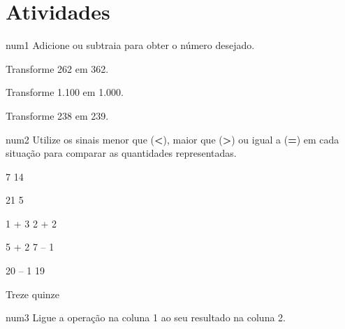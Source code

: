 \pagebreak 

\section*{Atividades}

num{1} Adicione ou subtraia para obter o número desejado.

\begin{escolha}

\item
  Transforme 262 em 362.\\

\item
  Transforme 1.100 em 1.000.\\

\item
  Transforme 238 em 239.\\
\end{escolha}

num{2} Utilize os sinais menor que (\textbf{\textless{}}), maior que (\textbf{\textgreater{}}) ou igual a
(\textbf{=}) em cada situação para comparar as quantidades representadas.\bigskip

\begin{minipage}{.5\textwidth}
\begin{escolha}
\item
  7  14
\item
  21  5
\item
  1 + 3  2 + 2
  \end{escolha}
  \end{minipage}
\begin{minipage}{.5\textwidth}
  \begin{escolha}[start=4]
\item
  5 + 2  7 -- 1
\item
  20 -- 1  19
\item
  Treze  quinze
\end{escolha}
\end{minipage}

\pagebreak

num{3} Ligue a operação na coluna 1 ao seu resultado na coluna 2.

